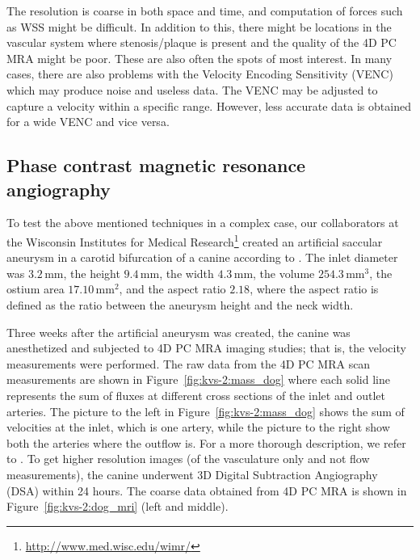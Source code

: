 The resolution is coarse in both space and time, and computation of
forces such as WSS might be difficult. In addition to this, there
might be locations in the vascular system where stenosis/plaque is
present and the quality of the 4D PC MRA might be poor. These are also
often the spots of most interest. In many cases, there are also
problems with the Velocity Encoding Sensitivity (VENC) which may
produce noise and useless data. The VENC may be adjusted to capture a
velocity within a specific range. However, less accurate data is
obtained for a wide VENC and vice versa.

\subsection{Phase contrast magnetic resonance angiography}

To test the above mentioned techniques in a complex case, our
collaborators at the Wisconsin Institutes for Medical
Research\footnote{\url{http://www.med.wisc.edu/wimr/}} created an
artificial saccular aneurysm in a carotid bifurcation of a canine
according to \citet{GermanBlack1965}. The inlet diameter was
$3.2\,\mathrm{mm}$, the height $9.4\,\mathrm{mm}$, the width
$4.3\,\mathrm{mm}$, the volume $254.3\,\mathrm{mm}^3$, the ostium area
$17.10\,\mathrm{mm}^2$, and the aspect ratio $2.18$, where the aspect
ratio is defined as the ratio between the aneurysm height and the neck
width.

Three weeks after the artificial aneurysm was created, the canine was
anesthetized and subjected to 4D PC MRA imaging studies; that is, the
velocity measurements were performed. The raw data from the 4D PC MRA
scan measurements are
shown in Figure~\ref{fig:kvs-2:mass_dog} where each solid line
represents the sum of fluxes at different cross sections of the
inlet and outlet arteries. The picture to the left in
Figure~\ref{fig:kvs-2:mass_dog} shows the sum of velocities at the
inlet, which is one artery, while the picture to the right show both
the arteries where the outflow is. For a more thorough description, we
refer to \citet{JiangJohnsonValen-SendstadEtAl2010}. To get higher
resolution images (of the vasculature only and not flow measurements),
the canine underwent 3D Digital Subtraction Angiography (DSA) within
24 hours. The coarse data obtained from 4D PC MRA is shown in
Figure~\ref{fig:kvs-2:dog_mri} (left and middle).


